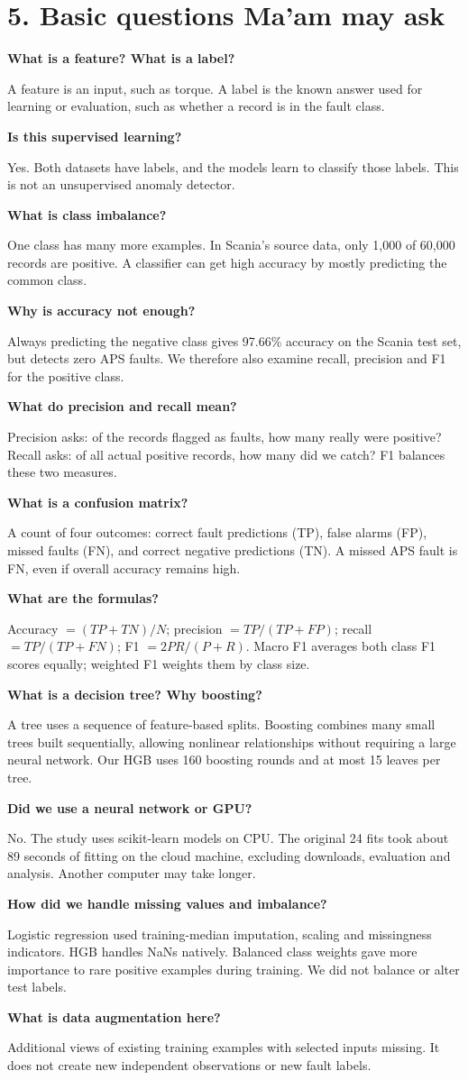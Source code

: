 \documentclass[11pt,a4paper]{article}
\newcommand{\qa}[2]{\textbf{#1}\par #2\par}
\begin{document}
\section*{5. Basic questions Ma'am may ask}
\qa{What is a feature? What is a label?}{A feature is an input, such as torque. A label is the known answer used for learning or evaluation, such as whether a record is in the fault class.}
\qa{Is this supervised learning?}{Yes. Both datasets have labels, and the models learn to classify those labels. This is not an unsupervised anomaly detector.}
\qa{What is class imbalance?}{One class has many more examples. In Scania's source data, only 1,000 of 60,000 records are positive. A classifier can get high accuracy by mostly predicting the common class.}
\qa{Why is accuracy not enough?}{Always predicting the negative class gives 97.66\% accuracy on the Scania test set, but detects zero APS faults. We therefore also examine recall, precision and F1 for the positive class.}
\qa{What do precision and recall mean?}{Precision asks: of the records flagged as faults, how many really were positive? Recall asks: of all actual positive records, how many did we catch? F1 balances these two measures.}
\qa{What is a confusion matrix?}{A count of four outcomes: correct fault predictions (TP), false alarms (FP), missed faults (FN), and correct negative predictions (TN). A missed APS fault is FN, even if overall accuracy remains high.}
\qa{What are the formulas?}{Accuracy $=(TP+TN)/N$; precision $=TP/(TP+FP)$; recall $=TP/(TP+FN)$; F1 $=2PR/(P+R)$. Macro F1 averages both class F1 scores equally; weighted F1 weights them by class size.}
\qa{What is a decision tree? Why boosting?}{A tree uses a sequence of feature-based splits. Boosting combines many small trees built sequentially, allowing nonlinear relationships without requiring a large neural network. Our HGB uses 160 boosting rounds and at most 15 leaves per tree.}
\qa{Did we use a neural network or GPU?}{No. The study uses scikit-learn models on CPU. The original 24 fits took about 89 seconds of fitting on the cloud machine, excluding downloads, evaluation and analysis. Another computer may take longer.}
\qa{How did we handle missing values and imbalance?}{Logistic regression used training-median imputation, scaling and missingness indicators. HGB handles NaNs natively. Balanced class weights gave more importance to rare positive examples during training. We did not balance or alter test labels.}
\qa{What is data augmentation here?}{Additional views of existing training examples with selected inputs missing. It does not create new independent observations or new fault labels.}
\end{document}
